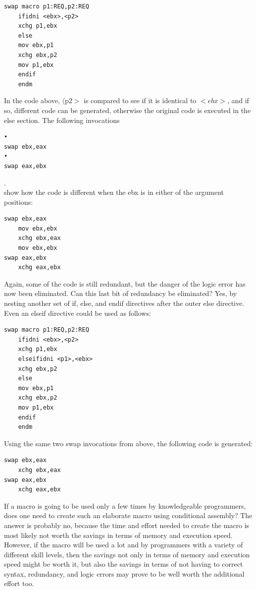 \documentclass[10pt]{book}
\begin{document}
\begin{verbatim}
swap macro p1:REQ,p2:REQ
    ifidni <ebx>,<p2>
    xchg p1,ebx
    else
    mov ebx,p1
    xchg ebx,p2
    mov p1,ebx
    endif
    endm
\end{verbatim}

In the code above, $\langle\mathrm{p} 2>$ is compared to see if it is identical to $<e b x>$, and if so, different code can be generated, otherwise the original code is executed in the else section. The following invocations

\begin{verbatim}
•
swap ebx,eax
•
swap eax,ebx
\end{verbatim}

.\\
show how the code is different when the ebx is in either of the argument positions:

\begin{verbatim}
swap ebx,eax
    mov ebx,ebx
    xchg ebx,eax
    mov ebx,ebx
swap eax,ebx
    xchg eax,ebx
\end{verbatim}

Again, some of the code is still redundant, but the danger of the logic error has now been eliminated. Can this last bit of redundancy be eliminated? Yes, by nesting another set of if, else, and endif directives after the outer else directive. Even an elseif directive could be used as follows:

\begin{verbatim}
swap macro p1:REQ,p2:REQ
    ifidni <ebx>,<p2>
    xchg p1,ebx
    elseifidni <p1>,<ebx>
    xchg ebx,p2
    else
    mov ebx,p1
    xchg ebx,p2
    mov p1,ebx
    endif
    endm
\end{verbatim}

Using the same two swap invocations from above, the following code is generated:

\begin{verbatim}
swap ebx,eax
    xchg ebx,eax
swap eax,ebx
    xchg eax,ebx
\end{verbatim}

If a macro is going to be used only a few times by knowledgeable programmers, does one need to create such an elaborate macro using conditional assembly? The answer is probably no, because the time and effort needed to create the macro is most likely not worth the savings in terms of memory and execution speed. However, if the macro will be used a lot and by programmers with a variety of different skill levels, then the savings not only in terms of memory and execution speed might be worth it, but also the savings in terms of not having to correct syntax, redundancy, and logic errors may prove to be well worth the additional effort too.
\end{document}
